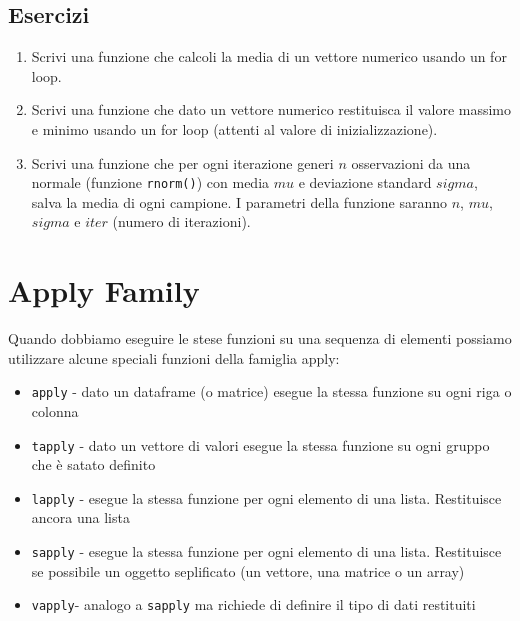 \documentclass[
]{book}
\providecommand{\tightlist}{%
  \setlength{\itemsep}{0pt}\setlength{\parskip}{0pt}}
\begin{document}
\hypertarget{esercizi-16}{%
\subsection*{Esercizi}\label{esercizi-16}}

\begin{enumerate}
\def\labelenumi{\arabic{enumi}.}
\tightlist
\item
  Scrivi una funzione che calcoli la media di un vettore numerico usando un for loop.
\item
  Scrivi una funzione che dato un vettore numerico restituisca il valore massimo e minimo usando un for loop (attenti al valore di inizializzazione).
\item
  Scrivi una funzione che per ogni iterazione generi \(n\) osservazioni da una normale (funzione \texttt{rnorm()}) con media \(mu\) e deviazione standard \(sigma\), salva la media di ogni campione. I parametri della funzione saranno \(n\), \(mu\), \(sigma\) e \(iter\) (numero di iterazioni).
\end{enumerate}

\hypertarget{apply-family}{%
\section{Apply Family}\label{apply-family}}

Quando dobbiamo eseguire le stese funzioni su una sequenza di elementi possiamo utilizzare alcune speciali funzioni della famiglia apply:

\begin{itemize}
\tightlist
\item
  \texttt{apply} - dato un dataframe (o matrice) esegue la stessa funzione su ogni riga o colonna
\item
  \texttt{tapply} - dato un vettore di valori esegue la stessa funzione su ogni gruppo che è satato definito
\item
  \texttt{lapply} - esegue la stessa funzione per ogni elemento di una lista. Restituisce ancora una lista
\item
  \texttt{sapply} - esegue la stessa funzione per ogni elemento di una lista. Restituisce se possibile un oggetto seplificato (un vettore, una matrice o un array)
\item
  \texttt{vapply}- analogo a \texttt{sapply} ma richiede di definire il tipo di dati restituiti
\end{itemize}
\end{document}

